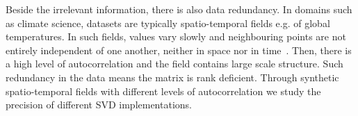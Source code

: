 \documentclass[ijgi,article,submit,moreauthors,pdftex,10pt,a4paper]{Definitions/mdpi}
\begin{document}
Beside the irrelevant information, there is also data redundancy. In domains such as climate science, datasets are typically spatio-temporal fields e.g. of global temperatures. In such fields, values vary slowly and neighbouring points are not entirely independent of one another, neither in space nor in time~\cite{Eshel2011}. Then, there is a high level of autocorrelation and the field contains large scale structure. Such redundancy in the data means the matrix is rank deficient. Through synthetic spatio-temporal fields with different levels of autocorrelation we study the precision of different SVD implementations.

%
%
%
\end{document}
